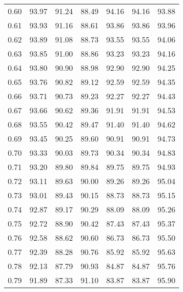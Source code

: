 \begin{tabular}{|c|c|c|c|c|c|c|}
      0.60 &     93.97 &     91.24 &      88.49 &   94.16 &      94.16 &         93.88 \\
      0.61 &     93.93 &     91.16 &      88.61 &   93.86 &      93.86 &         93.96 \\
      0.62 &     93.89 &     91.08 &      88.73 &   93.55 &      93.55 &         94.06 \\
      0.63 &     93.85 &     91.00 &      88.86 &   93.23 &      93.23 &         94.16 \\
      0.64 &     93.80 &     90.90 &      88.98 &   92.90 &      92.90 &         94.25 \\
      0.65 &     93.76 &     90.82 &      89.12 &   92.59 &      92.59 &         94.35 \\
      0.66 &     93.71 &     90.73 &      89.23 &   92.27 &      92.27 &         94.43 \\
      0.67 &     93.66 &     90.62 &      89.36 &   91.91 &      91.91 &         94.53 \\
      0.68 &     93.55 &     90.42 &      89.47 &   91.40 &      91.40 &         94.62 \\
      0.69 &     93.45 &     90.25 &      89.60 &   90.91 &      90.91 &         94.73 \\
      0.70 &     93.33 &     90.03 &      89.73 &   90.34 &      90.34 &         94.83 \\
      0.71 &     93.20 &     89.80 &      89.84 &   89.75 &      89.75 &         94.93 \\
      0.72 &     93.11 &     89.63 &      90.00 &   89.26 &      89.26 &         95.04 \\
      0.73 &     93.01 &     89.43 &      90.15 &   88.73 &      88.73 &         95.15 \\
      0.74 &     92.87 &     89.17 &      90.29 &   88.09 &      88.09 &         95.26 \\
      0.75 &     92.72 &     88.90 &      90.42 &   87.43 &      87.43 &         95.37 \\
      0.76 &     92.58 &     88.62 &      90.60 &   86.73 &      86.73 &         95.50 \\
      0.77 &     92.39 &     88.28 &      90.76 &   85.92 &      85.92 &         95.63 \\
      0.78 &     92.13 &     87.79 &      90.93 &   84.87 &      84.87 &         95.76 \\
      0.79 &     91.89 &     87.33 &      91.10 &   83.87 &      83.87 &         95.90 \\

\end{tabular}
